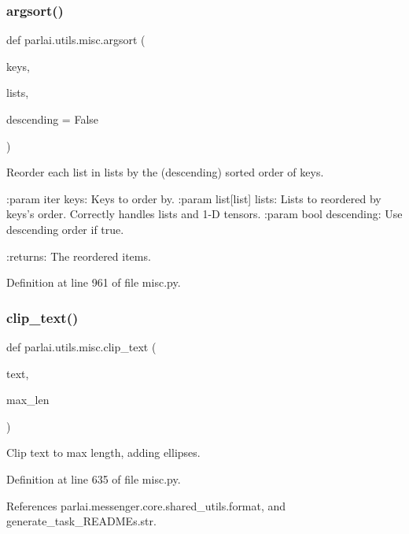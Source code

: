 \subsubsection{\texorpdfstring{argsort()}{argsort()}}
{\footnotesize\ttfamily def parlai.\+utils.\+misc.\+argsort (\begin{DoxyParamCaption}\item[{}]{keys,  }\item[{}]{lists,  }\item[{}]{descending = {\ttfamily False} }\end{DoxyParamCaption})}

\begin{DoxyVerb}Reorder each list in lists by the (descending) sorted order of keys.

:param iter keys:
    Keys to order by.
:param list[list] lists:
    Lists to reordered by keys's order.  Correctly handles lists and 1-D
    tensors.
:param bool descending:
    Use descending order if true.

:returns:
    The reordered items.
\end{DoxyVerb}
 

Definition at line 961 of file misc.\+py.

\mbox{\label{namespaceparlai_1_1utils_1_1misc_a219b248f4399036a381ca859aa97433e}} 
\subsubsection{\texorpdfstring{clip\+\_\+text()}{clip\_text()}}
{\footnotesize\ttfamily def parlai.\+utils.\+misc.\+clip\+\_\+text (\begin{DoxyParamCaption}\item[{}]{text,  }\item[{}]{max\+\_\+len }\end{DoxyParamCaption})}

\begin{DoxyVerb}Clip text to max length, adding ellipses.\end{DoxyVerb}
 

Definition at line 635 of file misc.\+py.



References parlai.\+messenger.\+core.\+shared\+\_\+utils.\+format, and generate\+\_\+task\+\_\+\+R\+E\+A\+D\+M\+Es.\+str.



